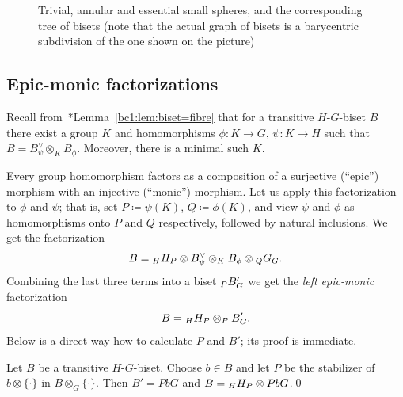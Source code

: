 \documentclass{amsart}
\begin{document}
\begin{figure}
\begin{center}
  \end{center}
  \caption{Trivial, annular and essential small spheres, and the corresponding tree of bisets (note that the actual graph of bisets is a barycentric subdivision of the one shown on the picture)  }\label{fig:taesmallspheres}
\end{figure}

\subsection{Epic-monic factorizations}\label{ss:epic-monic}
Recall
from~\cite{bartholdi-dudko:bc1}*{Lemma~\ref{bc1:lem:biset=fibre}} that
for a transitive $H$-$G$-biset $B$ there exist a group $K$ and
homomorphisms $\phi\colon K\to G$, $\psi\colon K\to H$ such that
$B=B_\psi^\vee\otimes_K B_\phi$. Moreover, there is a minimal such
$K$.

Every group homomorphism factors as a composition of a surjective
(``epic'') morphism with an injective (``monic'') morphism. Let us
apply this factorization to $\phi$ and $\psi$; that is, set
$P\coloneqq \psi(K)$, $Q\coloneqq \phi(K)$, and view $\psi$ and $\phi$
as homomorphisms onto $P$ and $Q$ respectively, followed by natural
inclusions. We get the factorization
\[B= \subscript{H}H_{P} \otimes B_\psi^\vee\otimes_K B_\phi \otimes
  \subscript{Q}G_G.
\]
Combining the last three terms into a biset $\subscript{P}B'_G$ we get the
\emph{left epic-monic} factorization
\[B=\subscript H H_{P} \otimes_{P}B'_{G}.
\]
Below is a direct way how to calculate $P$ and $B'$; its proof is
immediate.

\begin{lem}\label{Lem:leftInjDecomp}
  Let $B$ be a transitive $H$-$G$-biset. Choose $b\in B$ and let $P$
  be the stabilizer of $b\otimes \{\cdot\}$ in
  $B\otimes_{G} \{\cdot\} $. Then $B'=P b G$ and
  $B=\subscript{H}H_{P} \otimes P b G$.\qed
\end{lem}
\end{document}
